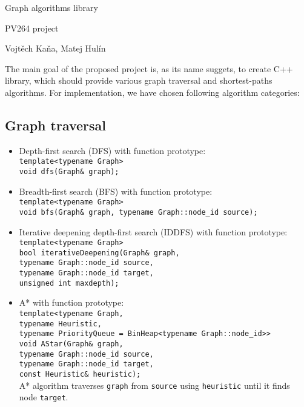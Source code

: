 \documentclass{article}
\begin{document}
\huge
\begin{center}
Graph algorithms library

\vspace{10pt}
\large
PV264 project
\vspace{10pt}

\normalsize
\foreignlanguage{czech}{Vojtěch Kaňa, Matej Hulín}
\vspace{20pt}
\end{center}

\normalsize

The main goal of the proposed project is, as its name suggets, to create C++ library, which should provide various graph traversal and shortest-paths algorithms. For implementation, we have chosen following algorithm categories:

\subsection*{Graph traversal}
\begin{itemize}
\item Depth-first search (DFS) with function prototype:\\
\texttt{template<typename Graph>\\
void dfs(Graph\& graph);}
\item Breadth-first search (BFS) with function prototype:\\
\texttt{template<typename Graph>\\
void bfs(Graph\& graph, typename Graph::node\_id source);}
\item Iterative deepening depth-first search (IDDFS) with function prototype:\\
\texttt{template<typename Graph>\\
bool iterativeDeepening(Graph\& graph,\\\hspace*{12em} typename Graph::node\_id source,\\\hspace*{12em}
typename Graph::node\_id target,\\\hspace*{12em} unsigned int maxdepth);}
\item A* with function prototype:\\
\texttt{template<typename Graph,\\\hspace*{4.75em}typename Heuristic,\\\hspace*{4.75em}typename PriorityQueue = BinHeap<typename Graph::node\_id>>\\
void AStar(Graph\& graph,\\\hspace*{5.27em} typename Graph::node\_id source,\\\hspace*{5.27em}
typename Graph::node\_id target,\\\hspace*{5.27em}
const Heuristic\& heuristic);}\\
A* algorithm traverses \texttt{graph} from \texttt{source} using \texttt{heuristic} until it finds node \texttt{target}.
\end{itemize}
\end{document}

